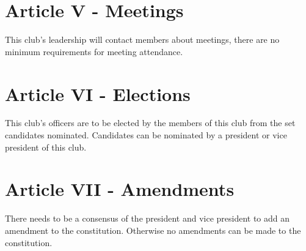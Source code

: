 \documentclass[a4, 12p]{article}
\begin{document}
\section*{Article V - Meetings}
This club's leadership will contact members about meetings, there are no minimum requirements for meeting attendance.

\section*{Article VI - Elections}
This club's officers are to be elected by the members of this club from the set candidates nominated. Candidates can be nominated by a president or vice president of this club.

\section*{Article VII - Amendments}
There needs to be a consensus of the president and vice president to add an amendment to the constitution. Otherwise no amendments can be made to the constitution.
\end{document}
